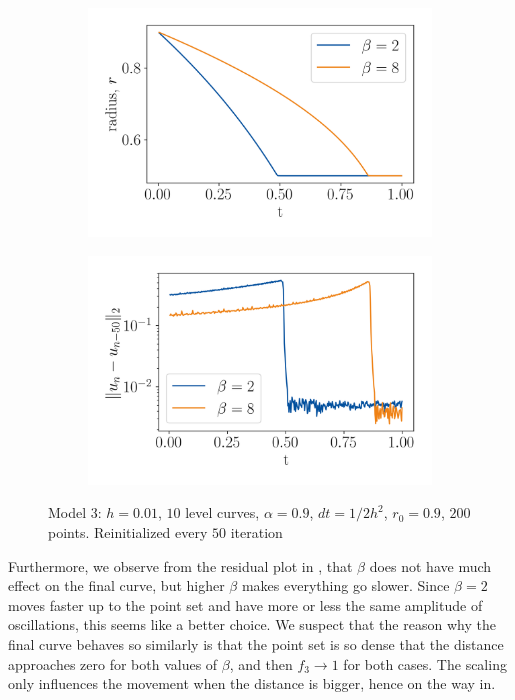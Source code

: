 \begin{figure}
    \centering
    \begin{subfigure}[h]{0.49\textwidth}
        \centering
        \includegraphics[width=\linewidth]{figures/Results/Circle/model3/b2_b8_rad.png}
    \end{subfigure}%
    \begin{subfigure}[h]{0.49\textwidth}
        \centering
        \includegraphics[width=\linewidth]{figures/Results/Circle/model3/b2_b8_res.png}
    \end{subfigure}
    \caption[Model 3 - Circular example, $\beta$ parameter]{Model 3: $h=0.01$, $10$ level curves, $\alpha=0.9$, $dt=1/2 h^2$, $r_0=0.9$, $200$ points. Reinitialized every $50$ iteration}
    \label{fig:model3-circle-betas}
\end{figure}
Furthermore, we observe from the residual plot in , that $\beta$ does not have much effect on the final curve, but higher $\beta$ makes everything go slower. Since $\beta=2$ moves faster up to the point set and have more or less the same amplitude of oscillations, this seems like a better choice. We suspect that the reason why the final curve behaves so similarly is that the point set is so dense that the distance approaches zero for both values of $\beta$, and then $f_3\to 1$ for both cases. The scaling only influences the movement when the distance is bigger, hence on the way in. 

